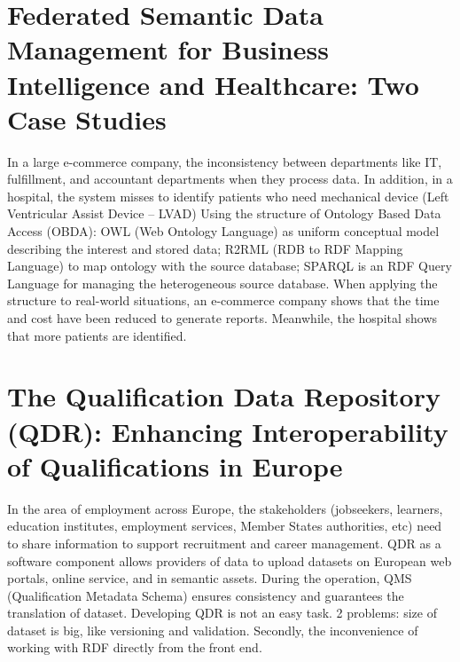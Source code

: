     \section{Federated Semantic Data Management for Business Intelligence and Healthcare: Two Case Studies}

    In a large e-commerce company, the inconsistency between departments like IT, fulfillment, and accountant departments when they process data. In addition, in a hospital, the system misses to identify patients who need mechanical device (Left Ventricular Assist Device – LVAD)
    Using the structure of Ontology Based Data Access (OBDA): OWL (Web Ontology Language) as uniform conceptual model describing the interest and stored data; R2RML (RDB to RDF Mapping Language) to map ontology with the source database; SPARQL is an RDF Query Language for managing the heterogeneous source database.
    When applying the structure to real-world situations, an e-commerce company shows that the time and cost have been reduced to generate reports. Meanwhile, the hospital shows that more patients are identified.

    \section{The Qualification Data Repository (QDR): Enhancing Interoperability of Qualifications in Europe}

    
    In the area of employment across Europe, the stakeholders (jobseekers, learners, education institutes, employment services, Member States authorities, etc) need to share information to support recruitment and career management.
    QDR as a software component allows providers of data to upload datasets on European web portals, online service, and in semantic assets. During the operation, QMS (Qualification Metadata Schema) ensures consistency and guarantees the translation of dataset.
    Developing QDR is not an easy task. 2 problems: size of dataset is big, like versioning and validation. Secondly, the inconvenience of working with RDF directly from the front end.


